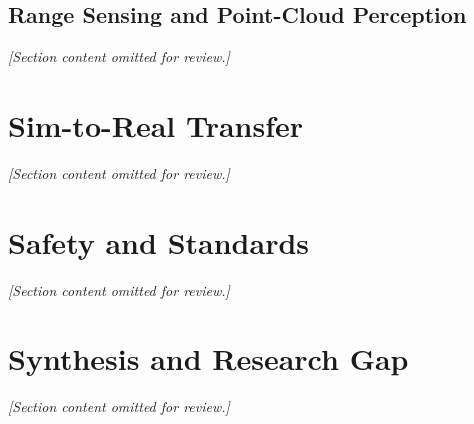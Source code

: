 \subsection{Range Sensing and Point-Cloud Perception}
\textit{[Section content omitted for review.]}

\section{Sim-to-Real Transfer}
\textit{[Section content omitted for review.]}

\section{Safety and Standards}
\textit{[Section content omitted for review.]}

\section{Synthesis and Research Gap}
\textit{[Section content omitted for review.]}
